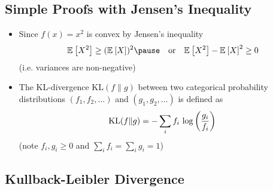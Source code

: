 
\begin{slide}
\section{Simple Proofs with Jensen's Inequality}

\begin{PauseHighLight}
  \begin{itemize}
  \item Since $f(x) = x^2$ is convex by Jensen's inequality
    \begin{align*}
      \av{X^2} \geq  (\av{X})^2\pause \quad \text{or} \quad
      \av{X^2}-\av{X}^2 \geq 0
    \end{align*}
    (i.e. variances are non-negative)\pause
  \item The KL-divergence $\mathrm{KL}(f \| g)$ between two
    categorical probability distributions $(f_1,f_2,\ldots)$ and
    $(g_1,g_2,\ldots)$ is defined as
    \begin{align*}
      \mathrm{KL}(f \| g) = - \sum_i f_i \, \log\left( \frac{g_i}{f_i} \right)
    \end{align*}
    (note $f_i,g_i\geq 0$ and $\sum\limits_i f_i = \sum\limits_i g_i
    =1 $)\pause
  \end{itemize}
\end{PauseHighLight}

\end{slide}


\begin{slide}
\section[-2]{Kullback-Leibler Divergence}

\pb\pause{}
\begin{center}
  \pause
\end{center}
\end{slide}



